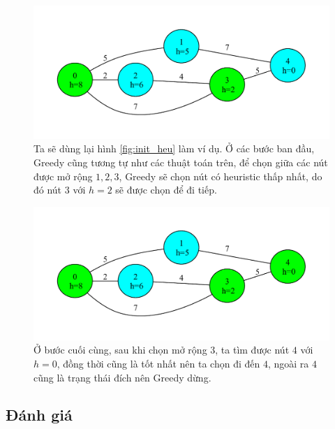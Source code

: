 \begin{figure}[H]
    \centering
    \includegraphics[scale=0.7]{figure/Greedy/2.pdf}
    \caption{Ta sẽ dùng lại hình \ref{fig:init_heu} làm ví dụ. Ở các bước ban đầu, Greedy cũng tương tự như các thuật toán trên, để chọn giữa các nút được mở rộng $1, 2, 3$, Greedy sẽ chọn nút có heuristic thấp nhất, do đó nút $3$ với $h=2$ sẽ được chọn để đi tiếp.}
    \label{fig:Greedy_2}
\end{figure}

\begin{figure}[H]
    \centering
    \includegraphics[scale=0.7]{figure/Greedy/3.pdf}
    \caption{Ở bước cuối cùng, sau khi chọn mở rộng $3$, ta tìm được nút $4$ với $h=0$, đồng thời cũng là tốt nhất nên ta chọn đi đến $4$, ngoài ra $4$ cũng là trạng thái đích nên Greedy dừng.}
    \label{fig:Greedy_3}
\end{figure}

\subsection{Đánh giá}

